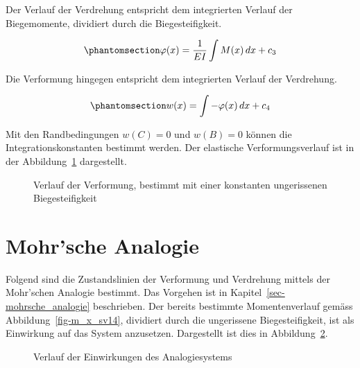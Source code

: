 \documentclass[
  12pt,
  letterpaper,
  egregdoesnotlikesansseriftitles]{scrreprt}
\begin{document}
Der Verlauf der Verdrehung entspricht dem integrierten Verlauf der
Biegemomente, dividiert durch die Biegesteifigkeit.

\begin{equation}\phantomsection\label{eq-verdrehung_sv14}{
\varphi(x) = \frac{1}{EI}\int M(x) \, dx + c_3
}\end{equation}

Die Verformung hingegen entspricht dem integrierten Verlauf der
Verdrehung.

\begin{equation}\phantomsection\label{eq-verformung_sv14}{
w(x) = \int -\varphi(x) \, dx + c_4
}\end{equation}

Mit den Randbedingungen \(w(C) = 0\) und \(w(B) = 0\) können die
Integrationskonstanten bestimmt werden. Der elastische
Verformungsverlauf ist in der Abbildung~\ref{fig-w_x_sv14} dargestellt.

\begin{figure}[H]


\caption{\label{fig-w_x_sv14}Verlauf der Verformung, bestimmt mit einer
konstanten ungerissenen Biegesteifigkeit}

\end{figure}%

\section{Mohr'sche Analogie}\label{mohrsche-analogie-1}

Folgend sind die Zustandslinien der Verformung und Verdrehung mittels
der Mohr'schen Analogie bestimmt. Das Vorgehen ist in
Kapitel~\ref{sec-mohrsche_analogie} beschrieben. Der bereits bestimmte
Momentenverlauf gemäss Abbildung~\ref{fig-m_x_sv14}, dividiert durch die
ungerissene Biegesteifigkeit, ist als Einwirkung auf das System
anzusetzen. Dargestellt ist dies in Abbildung~\ref{fig-q_x_mohr_sv14}.

\begin{figure}[H]


\caption{\label{fig-q_x_mohr_sv14}Verlauf der Einwirkungen des
Analogiesystems}

\end{figure}%
\end{document}
